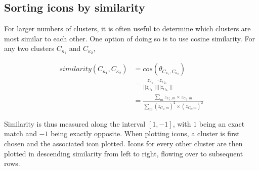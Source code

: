 \subsection{Sorting icons by similarity}
For larger numbers of clusters, it is often useful to determine which clusters are most similar to each other. One option of doing so is to use cosine similarity. For any two clusters $C_{\kappa_1}$ and $C_{\kappa_2}$,

\begin{equation}\label{eqn:cosine_similarity}
    \begin{split}
    similarity(C_{\kappa_1}, C_{\kappa_2}) &= cos\left(\theta_{C_{\kappa_1}, C_{\kappa_2}}\right) \\
                                           &= \frac{z_{C_1,.} \cdot z_{C_2,.}}{|\!|z_{C_1,.}|\!||\!|z_{C_2,.}|\!|} \\
                                           &= \frac{\sum\nolimits_{m} z_{C_1,m} \times z_{C_2,m} }{ \sum\nolimits_{m} \left(z_{C_1,m}\right)^2 \times \left(z_{C_2,m}\right)^2 }
    \end{split}
\end{equation}

Similarity is thus measured along the interval $[1,-1]$, with $1$ being an exact match and $-1$ being exactly opposite. When plotting icons, a cluster is first chosen and the associated icon plotted. Icons for every other cluster are then plotted in descending similarity from left to right, flowing over to subsequent rows.
